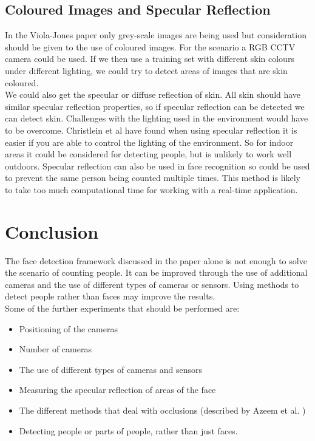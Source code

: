 \documentclass[10pt,a4paper,openbib]{article}
\begin{document}
\begin{multicols}{2}
 \subsection{Coloured Images and Specular Reflection}
In the Viola-Jones paper\cite{violaJones} only grey-scale images are being used but consideration should be given to the use of coloured images. For the scenario a RGB CCTV camera could be used. If we then use a training set with different skin colours under different lighting, we could try to detect areas of images that are skin coloured. \\
 
 \noindent We could also get the specular or diffuse reflection of skin.\cite{specularRefelection} All skin should have similar specular reflection properties, so if specular reflection can be detected we can detect skin. Challenges with the lighting used in the environment would have to be overcome. Christlein et al\cite{faceRec} have found when using specular reflection it is easier if you are able to control the lighting of the environment. So for indoor areas it could be considered for detecting people, but is unlikely to work well outdoors. Specular reflection can also be used in face recognition so could be used to prevent the same person being counted multiple times. This method is likely to take too much computational time for working with a real-time application.  

\section{Conclusion}
The face detection framework discussed in the paper\cite{violaJones} alone is not enough to solve the scenario of counting people. It can be improved through the use of additional cameras and the use of different types of cameras or sensors. Using methods to detect people rather than faces may improve the results. \\

\noindent Some of the further experiments that should be performed are:
\begin{itemize}
\item Positioning of the cameras
\item Number of cameras
\item The use of different types of cameras and sensors 
\item Measuring the specular reflection of areas of the face
\item The different methods that deal with occlusions (described by Azeem et al.  \cite{occlusions})
\item Detecting people or parts of people, rather than just faces.
\end{itemize}


\end{multicols}
\end{document}
